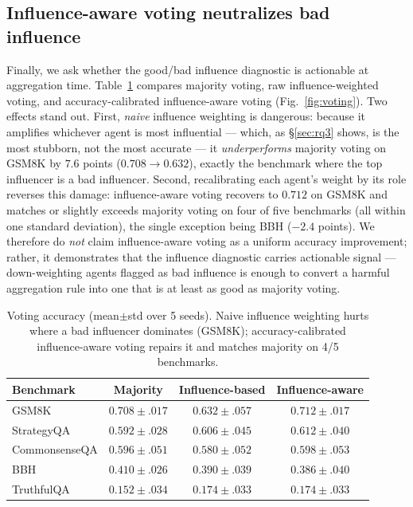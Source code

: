 \subsection{Influence-aware voting neutralizes bad influence}
\label{sec:rq5}

Finally, we ask whether the good/bad influence diagnostic is actionable at
aggregation time. Table~\ref{tab:voting} compares majority voting, raw
influence-weighted voting, and accuracy-calibrated influence-aware voting
(Fig.~\ref{fig:voting}). Two effects stand out. First, \emph{naive} influence
weighting is dangerous: because it amplifies whichever agent is most influential ---
which, as \S\ref{sec:rq3} shows, is the most stubborn, not the most accurate --- it
\emph{underperforms} majority voting on GSM8K by $7.6$ points ($0.708\!\to\!0.632$),
exactly the benchmark where the top influencer is a bad influencer. Second,
recalibrating each agent's weight by its role reverses this damage: influence-aware
voting recovers to $0.712$ on GSM8K and matches or slightly exceeds majority voting
on four of five benchmarks (all within one standard deviation), the single exception
being BBH ($-2.4$ points). We therefore do \emph{not} claim influence-aware voting
as a uniform accuracy improvement; rather, it demonstrates that the influence
diagnostic carries actionable signal --- down-weighting agents flagged as bad
influence is enough to convert a harmful aggregation rule into one that is at least
as good as majority voting.

\begin{table}[t]
\centering
\small
\caption{Voting accuracy (mean$\pm$std over 5 seeds). Naive influence weighting hurts
where a bad influencer dominates (GSM8K); accuracy-calibrated influence-aware voting
repairs it and matches majority on 4/5 benchmarks.}
\label{tab:voting}
\begin{tabular}{lccc}
\toprule
Benchmark & Majority & Influence-based & Influence-aware \\
\midrule
GSM8K         & $0.708{\pm}.017$ & $0.632{\pm}.057$ & $\mathbf{0.712}{\pm}.017$ \\
StrategyQA    & $0.592{\pm}.028$ & $0.606{\pm}.045$ & $\mathbf{0.612}{\pm}.040$ \\
CommonsenseQA & $0.596{\pm}.051$ & $0.580{\pm}.052$ & $\mathbf{0.598}{\pm}.053$ \\
BBH           & $\mathbf{0.410}{\pm}.026$ & $0.390{\pm}.039$ & $0.386{\pm}.040$ \\
TruthfulQA    & $0.152{\pm}.034$ & $\mathbf{0.174}{\pm}.033$ & $\mathbf{0.174}{\pm}.033$ \\
\bottomrule
\end{tabular}
\end{table}

